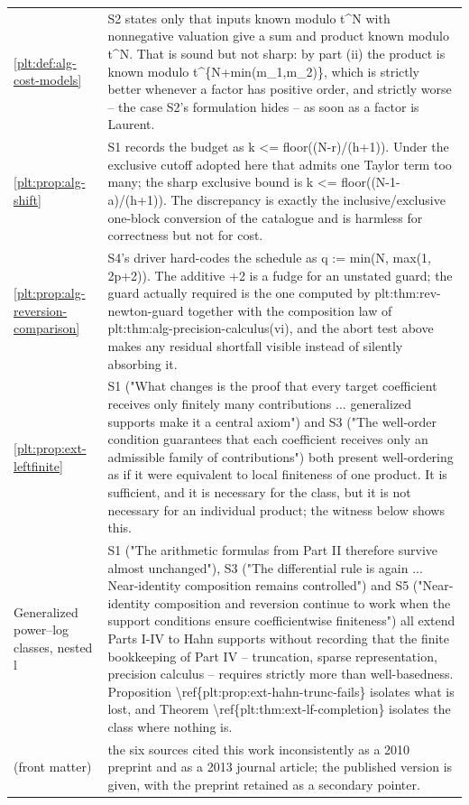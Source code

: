 \documentclass[11pt,oneside]{article}
\theoremstyle{plain}
\theoremstyle{definition}
\theoremstyle{remark}
\begin{document}
\begin{longtable}{@{}p{} p{}@{}}
\cref{plt:def:alg-cost-models} & S2 states only that inputs known modulo t\textasciicircum N with nonnegative valuation give a sum and product known modulo t\textasciicircum N. That is sound but not sharp: by part (ii) the product is known modulo t\textasciicircum \{N+min(m\_1,m\_2)\}, which is strictly better whenever a factor has positive order, and strictly worse -- the case S2's formulation hides -- as soon as a factor is Laurent.\\
\cref{plt:prop:alg-shift} & S1 records the budget as k <= floor((N-r)/(h+1)). Under the exclusive cutoff adopted here that admits one Taylor term too many; the sharp exclusive bound is k <= floor((N-1-a)/(h+1)). The discrepancy is exactly the inclusive/exclusive one-block conversion of the catalogue and is harmless for correctness but not for cost.\\
\cref{plt:prop:alg-reversion-comparison} & S4's driver hard-codes the schedule as q := min(N, max(1, 2p+2)). The additive +2 is a fudge for an unstated guard; the guard actually required is the one computed by plt:thm:rev-newton-guard together with the composition law of plt:thm:alg-precision-calculus(vi), and the abort test above makes any residual shortfall visible instead of silently absorbing it.\\
\cref{plt:prop:ext-leftfinite} & S1 ("What changes is the proof that every target coefficient receives only finitely many contributions ... generalized supports make it a central axiom") and S3 ("The well-order condition guarantees that each coefficient receives only an admissible family of contributions") both present well-ordering as if it were equivalent to local finiteness of one product. It is sufficient, and it is necessary for the class, but it is not necessary for an individual product; the witness below shows this.\\
Generalized power--log classes, nested l & S1 ("The arithmetic formulas from Part II therefore survive almost unchanged"), S3 ("The differential rule is again ... Near-identity composition remains controlled") and S5 ("Near-identity composition and reversion continue to work when the support conditions ensure coefficientwise finiteness") all extend Parts I-IV to Hahn supports without recording that the finite bookkeeping of Part IV -- truncation, sparse representation, precision calculus -- requires strictly more than well-basedness. Proposition \textbackslash ref\{plt:prop:ext-hahn-trunc-fails\} isolates what is lost, and Theorem \textbackslash ref\{plt:thm:ext-lf-completion\} isolates the class where nothing is.\\
(front matter) & the six sources cited this work inconsistently as a 2010 preprint and as a 2013 journal article; the published version is given, with the preprint retained as a secondary pointer.\\
\bottomrule
\end{longtable}
\end{document}

